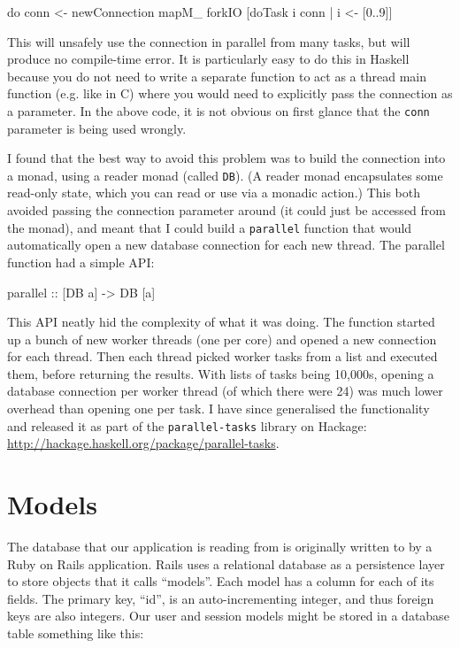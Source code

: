 \documentclass{tmr}
\begin{document}
\begin{code}
do conn <- newConnection
   mapM_ forkIO [doTask i conn | i <- [0..9]]
\end{code}

This will unsafely use the connection in parallel from many tasks, but will produce no compile-time error.  It is particularly easy to do this in Haskell because you do not need to write a separate function to act as a thread main function (e.g. like in C) where you would need to explicitly pass the connection as a parameter.  In the above code, it is not obvious on first glance that the \lstinline|conn| parameter is being used wrongly.

I found that the best way to avoid this problem was to build the connection into a monad, using a reader monad (called \lstinline|DB|).  (A reader monad encapsulates some read-only state, which you can read or use via a monadic action.)  This both avoided passing the connection parameter around (it could just be accessed from the monad), and meant that I could build a \lstinline|parallel| function that would automatically open a new database connection for each new thread.  The parallel function had a simple API:

\begin{code}
parallel :: [DB a] -> DB [a]
\end{code}

This API neatly hid the complexity of what it was doing.  The function started up a bunch of new worker threads (one per core) and opened a new connection for each thread.  Then each thread picked worker tasks from a list and executed them, before returning the results.  With lists of tasks being 10,000s, opening a database connection per worker thread (of which there were 24) was much lower overhead than opening one per task.  I have since generalised the functionality and released it as part of the \texttt{parallel-tasks} library on Hackage: \url{http://hackage.haskell.org/package/parallel-tasks}.

\section{Models}

The database that our application is reading from is originally written to by a Ruby on Rails application.  Rails uses a relational database as a persistence layer to store objects that it calls ``models''.  Each model has a column for each of its fields.  The primary key, ``id'', is an auto-incrementing integer, and thus foreign keys are also integers.  Our user and session models might be stored in a database table something like this:
\end{document}
